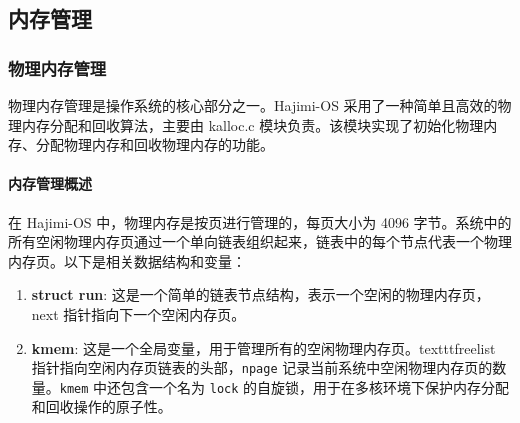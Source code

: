 \documentclass[UTF8]{article}
\begin{document}
\subsection{内存管理}
\subsubsection{物理内存管理}
物理内存管理是操作系统的核心部分之一。Hajimi-OS 采用了一种简单且高效的物理内存分配和回收算法，主要由 kalloc.c 模块负责。该模块实现了初始化物理内存、分配物理内存和回收物理内存的功能。

\paragraph{内存管理概述\\}
在 Hajimi-OS 中，物理内存是按页进行管理的，每页大小为 4096 字节。系统中的所有空闲物理内存页通过一个单向链表组织起来，链表中的每个节点代表一个物理内存页。以下是相关数据结构和变量：
\begin{enumerate}[label=\textbf{\arabic*}., wide, labelwidth=!, labelindent=0pt]
  \item \textbf{struct run}: 这是一个简单的链表节点结构，表示一个空闲的物理内存页，next 指针指向下一个空闲内存页。
        
  \item \textbf{kmem}: 这是一个全局变量，用于管理所有的空闲物理内存页。texttt{freelist} 指针指向空闲内存页链表的头部，\texttt{npage} 记录当前系统中空闲物理内存页的数量。\texttt{kmem} 中还包含一个名为 \texttt{lock} 的自旋锁，用于在多核环境下保护内存分配和回收操作的原子性。
        
\end{enumerate}
\end{document}
